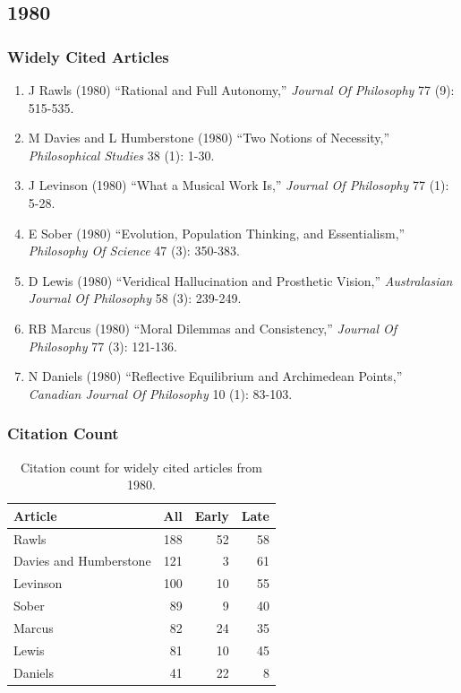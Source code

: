 \documentclass[
  10pt,
  letterpaper,
  DIV=11,
  numbers=noendperiod,
  twoside]{scrartcl}
\providecommand{\tightlist}{%
  \setlength{\itemsep}{0pt}\setlength{\parskip}{0pt}}\usepackage{longtable,booktabs,array}
\begin{document}
\newpage

\subsection{1980}\label{sec-s1980}

\subsubsection*{Widely Cited Articles}\label{widely-cited-articles-24}

\begin{enumerate}
\def\labelenumi{\arabic{enumi}.}
\tightlist
\item
  J Rawls (1980) ``Rational and Full Autonomy,'' \emph{Journal Of
  Philosophy} 77 (9): 515-535.
\item
  M Davies and L Humberstone (1980) ``Two Notions of Necessity,''
  \emph{Philosophical Studies} 38 (1): 1-30.
\item
  J Levinson (1980) ``What a Musical Work Is,'' \emph{Journal Of
  Philosophy} 77 (1): 5-28.
\item
  E Sober (1980) ``Evolution, Population Thinking, and Essentialism,''
  \emph{Philosophy Of Science} 47 (3): 350-383.
\item
  D Lewis (1980) ``Veridical Hallucination and Prosthetic Vision,''
  \emph{Australasian Journal Of Philosophy} 58 (3): 239-249.
\item
  RB Marcus (1980) ``Moral Dilemmas and Consistency,'' \emph{Journal Of
  Philosophy} 77 (3): 121-136.
\item
  N Daniels (1980) ``Reflective Equilibrium and Archimedean Points,''
  \emph{Canadian Journal Of Philosophy} 10 (1): 83-103.
\end{enumerate}

\subsubsection*{Citation Count}\label{sec-count-1980}

\begin{longtable}[]{@{}lrrr@{}}

\caption{\label{tbl-citation-count-1980}Citation count for widely cited
articles from 1980.}

\tabularnewline

\toprule\noalign{}
Article & All & Early & Late \\
\midrule\noalign{}
\endhead
\bottomrule\noalign{}
\endlastfoot
Rawls & 188 & 52 & 58 \\
Davies and Humberstone & 121 & 3 & 61 \\
Levinson & 100 & 10 & 55 \\
Sober & 89 & 9 & 40 \\
Marcus & 82 & 24 & 35 \\
Lewis & 81 & 10 & 45 \\
Daniels & 41 & 22 & 8 \\

\end{longtable}
\end{document}
